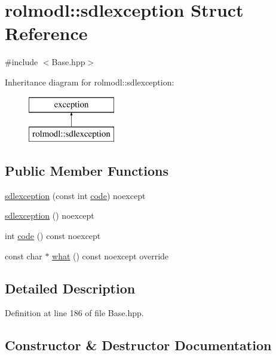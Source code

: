 \hypertarget{structrolmodl_1_1sdlexception}{}\section{rolmodl\+::sdlexception Struct Reference}
\label{structrolmodl_1_1sdlexception}


{\ttfamily \#include $<$Base.\+hpp$>$}

Inheritance diagram for rolmodl\+::sdlexception\+:\begin{figure}[H]
\begin{center}
\leavevmode
\includegraphics[height=2.000000cm]{structrolmodl_1_1sdlexception}
\end{center}
\end{figure}
\subsection*{Public Member Functions}
\begin{DoxyCompactItemize}
\item 
\mbox{\hyperlink{structrolmodl_1_1sdlexception_a9709d0cd85bc197058deeb3e720ca6f1}{sdlexception}} (const int \mbox{\hyperlink{structrolmodl_1_1sdlexception_a930d081c76f0d191ea13b86755416db1}{code}}) noexcept
\item 
\mbox{\hyperlink{structrolmodl_1_1sdlexception_a8c25ca2298c2d8becc22c6f67f1b63e9}{sdlexception}} () noexcept
\item 
int \mbox{\hyperlink{structrolmodl_1_1sdlexception_a930d081c76f0d191ea13b86755416db1}{code}} () const noexcept
\item 
const char $\ast$ \mbox{\hyperlink{structrolmodl_1_1sdlexception_a5c2efc9d1fefa9e8829688063641541c}{what}} () const noexcept override
\end{DoxyCompactItemize}


\subsection{Detailed Description}


Definition at line 186 of file Base.\+hpp.



\subsection{Constructor \& Destructor Documentation}
\mbox{\label{structrolmodl_1_1sdlexception_a9709d0cd85bc197058deeb3e720ca6f1}} 
